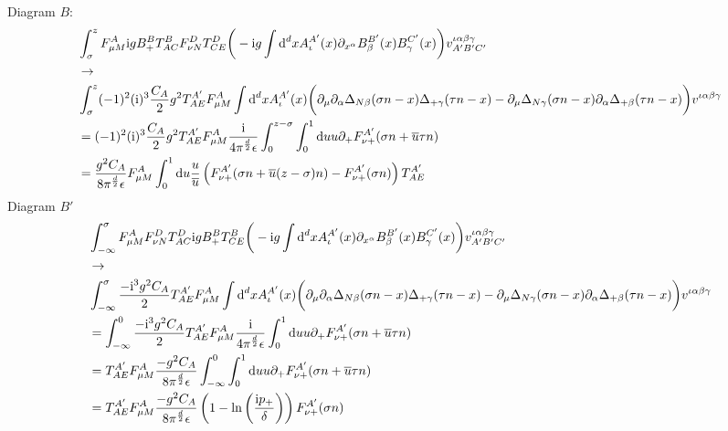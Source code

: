 Diagram $B$: 
\begin{align}
	&\int_{\sigma}^zF_{\mu M}^{A}\text{i} g B_+^B  T^B_{AC}F _{\nu N}^D T^D_{CE}\bigg(-\text{i} g \int \text{d} ^d xA_\iota^{A'}(x) \partial_{x^\alpha} B_\beta^{B'} (x) B_\gamma^{C'}(x) \bigg) v^{\iota \alpha\beta\gamma}_{A'B'C'}
	\\
	&\rightarrow
	\\
	&\int_{\sigma}^z(-1)^2(\text{i})^3\frac{C_A}{2} g^2T^{A'}_{AE} F_{\mu M}^{A}\int \text{d} ^d x A^{A'}_\iota(x)\bigg(\partial_\mu \partial_\alpha\Delta_{N\beta}(\sigma n - x)\Delta_{+\gamma}(\tau n -x) - \partial_\mu \Delta_{N\gamma}(\sigma n -x)\partial_\alpha \Delta_{+\beta}(\tau n -x) \bigg)v^{\iota\alpha\beta\gamma}
	\\
	&=
	(-1)^2(\text{i})^3\frac{C_A}{2} g^2T^{A'}_{AE} F_{\mu M}^{A}\frac{\text{i}}{4\pi^{\frac{d}{2}}\epsilon}\int_{0}^{z-\sigma}\int _0^1 \text{d} u u \partial_+ F_{\nu +}^{A'}(\sigma n+\overline u \tau n)
	\\
	&=
	\frac{g^2C_A}{8\pi^{\frac{d}{2}}\epsilon} F_{\mu M}^{A}\int _0^1 \text{d} u \frac{u}{\overline u} \left(F_{\nu +}^{A'}(\sigma n+\overline u (z-\sigma) n)-F^{A'}_{\nu +}(\sigma n)\right)T^{A'}_{AE}
\end{align}
Diagram $B'$
\begin{align}
	&\int_{-\infty}^\sigma F_{\mu M}^{A}F _{\nu N}^D T^D_{AC}\text{i} g B_+^B  T^B_{CE}\bigg(-\text{i} g \int \text{d} ^d xA_\iota^{A'}(x) \partial_{x^\alpha} B_\beta^{B'} (x) B_\gamma^{C'}(x) \bigg) v^{\iota \alpha\beta\gamma}_{A'B'C'}
	\\
	&\rightarrow
	\\
	&\int_{-\infty}^\sigma \frac{-\text{i}^3g^2C_A}{2} T^{A'}_{AE} F_{\mu M}^{A}\int \text{d} ^d x A^{A'}_\iota(x)\bigg(\partial_\mu \partial_\alpha\Delta_{N\beta}(\sigma n - x)\Delta_{+\gamma}(\tau n -x) - \partial_\mu \Delta_{N\gamma}(\sigma n -x)\partial_\alpha \Delta_{+\beta}(\tau n -x) \bigg)v^{\iota\alpha\beta\gamma}
	\\
	&=
	\int_{-\infty}^0 \frac{-\text{i}^3g^2C_A}{2} T^{A'}_{AE} F_{\mu M}^{A}\frac{\text{i}}{4\pi^{\frac{d}{2}}\epsilon}\int _0^1 \text{d} u u \partial_+ F_{\nu+}^{A'}(\sigma n+\overline u \tau n)
	\\
	&=
	T^{A'}_{AE} F_{\mu M}^{A}\frac{-g^2C_A}{8\pi^{\frac{d}{2}}\epsilon}\int_{-\infty}^0 \int _0^1 \text{d} u u \partial_+ F_{\nu+}^{A'}(\sigma n+\overline u \tau n)
	\\
	&=
	T^{A'}_{AE} F_{\mu M}^{A}\frac{-g^2C_A}{8\pi^{\frac{d}{2}}\epsilon}\left(1-\ln\left(\frac{\text{i} p_{+}}{\delta}\right)\right)F_{\nu+}^{A'}(\sigma n)
\end{align}
